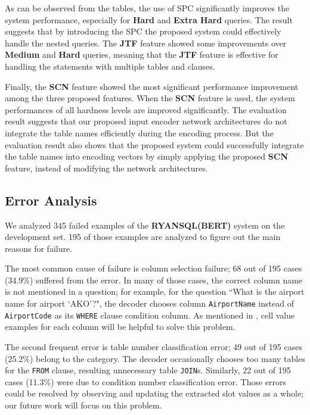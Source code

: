 \documentclass[11pt,a4paper]{article}
\begin{document}
As can be observed from the tables, the use of SPC significantly improves the system performance, especially for \textbf{Hard} and \textbf{Extra Hard} queries. The result suggests that by introducing the SPC the proposed system could effectively handle the nested queries. The \textbf{JTF} feature showed some improvements over \textbf{Medium} and \textbf{Hard} queries, meaning that the \textbf{JTF} feature is effective for handling the statements with multiple tables and clauses.

Finally, the \textbf{SCN} feature showed the most significant performance improvement among the three proposed features. When the \textbf{SCN} feature is used, the system performances of all hardness levels are improved significantly. The evaluation result suggests that our proposed input encoder network architectures do not integrate the table names efficiently during the encoding process. But the evaluation result also shows that the proposed system could successfully integrate the table names into encoding vectors by simply applying the proposed \textbf{SCN} feature, instead of modifying the network architectures.

\subsection{Error Analysis}
We analyzed 345 failed examples of the \textbf{RYANSQL(BERT)} system on the development set. 195 of those examples are analyzed to figure out the main reasons for failure.

The most common cause of failure is column selection failure; 68 out of 195 cases (34.9\%) suffered from the error. In many of those cases, the correct column name is not mentioned in a question; for example, for the question ``What is the airport name for airport `AKO'?", the decoder chooses column \texttt{AirportName} instead of \texttt{AirportCode} as its \texttt{WHERE} clause condition column. As mentioned in \citet{cellvalue}, cell value examples for each column will be helpful to solve this problem.

The second frequent error is table number classification error; 49 out of 195 cases (25.2\%) belong to the category. The decoder occasionally chooses too many tables for the \texttt{FROM} clause, resulting unnecessary table \texttt{JOIN}s. Similarly, 22 out of 195 cases (11.3\%) were due to condition number classification error. Those errors could be resolved by observing and updating the extracted slot values as a whole; our future work will focus on this problem.
\end{document}
